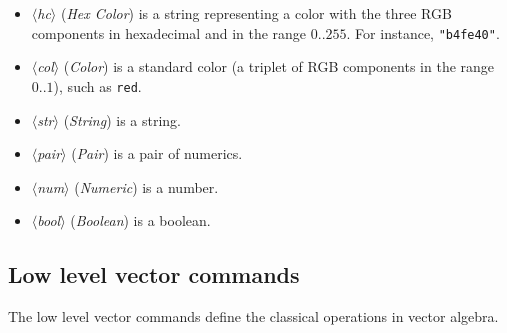 \documentclass[nonumber,harvardcite]{ltugboat}
\DeclareRobustCommand\meta[1]{%
       \ensuremath{\langle}\emph{#1}\ensuremath{\rangle}}
\newcommand{\HEXCOL}{\meta{hc}}
\newcommand{\COL}{\meta{col}}
\newcommand{\STR}{\meta{str}}
\newcommand{\PAIR}{\meta{pair}}
\newcommand{\NUM}{\meta{num}}
\newcommand{\BOOL}{\meta{bool}}
\begin{document}
\begin{itemize}
\item \HEXCOL{} (\emph{Hex Color}) is a string representing a color with
the three RGB components in hexadecimal and in the range
$0..255$. For instance, \verb|"b4fe40"|.
\item \COL{} (\emph{Color}) is a standard \MP{} color 
(a triplet of RGB components in the range $0..1$), 
such as \verb|red|.
\item \STR{} (\emph{String}) is a string.
\item \PAIR{} (\emph{Pair}) is a pair of numerics.
\item \NUM{} (\emph{Numeric}) is a number.
\item \BOOL{} (\emph{Boolean}) is a boolean.
\end{itemize}

\subsection{Low level vector commands}

The low level vector commands define the classical operations in vector
algebra.
\end{document}
